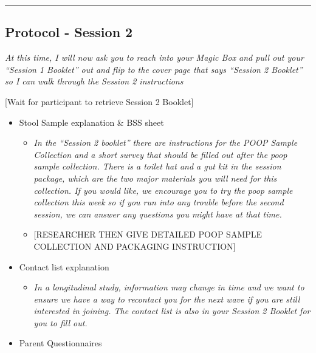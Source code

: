 \documentclass[]{book}
\providecommand{\tightlist}{%
  \setlength{\itemsep}{0pt}\setlength{\parskip}{0pt}}
\begin{document}
\begin{center}\rule{0.5\linewidth}{0.5pt}\end{center}

\hypertarget{protocol---session-2}{%
\subsection{Protocol - Session 2}\label{protocol---session-2}}

\emph{At this time, I will now ask you to reach into your Magic Box and pull out your ``Session 1 Booklet'' out and flip to the cover page that says ``Session 2 Booklet'' so I can walk through the Session 2 instructions}

{[}Wait for participant to retrieve Session 2 Booklet{]}

\begin{itemize}
\tightlist
\item
  Stool Sample explanation \& BSS sheet

  \begin{itemize}
  \tightlist
  \item
    \emph{In the ``Session 2 booklet'' there are instructions for the POOP Sample Collection and a short survey that should be filled out after the poop sample collection. There is a toilet hat and a gut kit in the session package, which are the two major materials you will need for this collection. If you would like, we encourage you to try the poop sample collection this week so if you run into any trouble before the second session, we can answer any questions you might have at that time.}
  \item
    {[}RESEARCHER THEN GIVE DETAILED POOP SAMPLE COLLECTION AND PACKAGING INSTRUCTION{]}
  \end{itemize}
\item
  Contact list explanation

  \begin{itemize}
  \tightlist
  \item
    \emph{In a longitudinal study, information may change in time and we want to ensure we have a way to recontact you for the next wave if you are still interested in joining. The contact list is also in your Session 2 Booklet for you to fill out.}
  \end{itemize}
\item
  Parent Questionnaires


\end{itemize}
\end{document}
